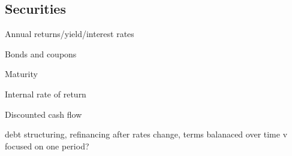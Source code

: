 
\subsection{Securities}

Annual returns/yield/interest rates

Bonds and coupons

Maturity

Internal rate of return

Discounted cash flow

debt structuring, refinancing after rates change, terms balanaced over time v focused on one period?



